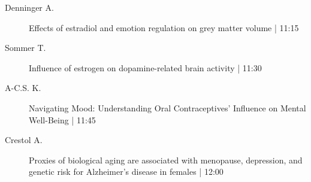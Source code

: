 \begin{symposium}
\begin{description}
                \item [ Denninger A.] Effects of estradiol and emotion regulation on grey matter volume  \textcolor{mygray}{ | 11:15}    
                
                \item [ Sommer T.] Influence of estrogen on dopamine-related brain activity \textcolor{mygray}{ | 11:30}    
                
                \item [ A-C.S. K.] Navigating Mood: Understanding Oral Contraceptives' Influence on Mental Well-Being  \textcolor{mygray}{ | 11:45}    
                
                \item [ Crestol A.] Proxies of biological aging are associated with menopause, depression, and genetic risk for Alzheimer’s disease in females \textcolor{mygray}{ | 12:00}    
                
            \end{description} 
            \end{symposium}
            